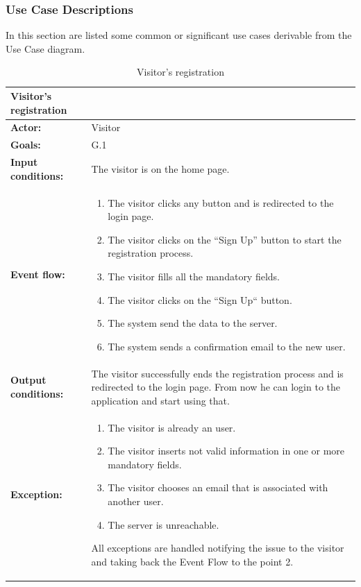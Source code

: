 \clearpage
\subsubsection{Use Case Descriptions}

In this section are listed some common or significant use cases derivable from
the Use Case diagram.

\begin{table}
\begin{tabular} { p{5cm} p{8cm} } 
\textbf{Visitor's registration} & \\
\hline
\textbf{Actor:} & Visitor \\ 
\textbf{Goals:} & G.1 \\ 
\textbf{Input conditions:} & The visitor is on the home page. \\
\textbf{Event flow:} & \begin{enumerate}
						\item
						The visitor clicks any button and is redirected to the login page.
						\item
						The visitor clicks on the “Sign Up” button to start the registration process.
						\item
						The visitor fills all the mandatory fields.
						\item
						The visitor clicks on the “Sign Up“ button.
						\item
						The system send the data to the server.
						\item
						The system sends a confirmation email to the new user.
						\end{enumerate}\\ 
\textbf{Output conditions:} & The visitor successfully ends the registration process and is redirected to the login page. From now he can login to the application and start using that. \\ 
\textbf{Exception:} & \begin{enumerate}
						\item
						The visitor is already an user.
						\item
						The visitor inserts not valid information in one or more mandatory fields.
						\item
						The visitor chooses an email that is associated with another user.
						\item
						The server is unreachable.
					\end{enumerate}
All exceptions are handled notifying the issue to the visitor and taking back the Event Flow to the point 2. \\
\hline
\end{tabular}
\caption{Visitor's registration}
\label{ref:visitorsregistration}
\end{table}

